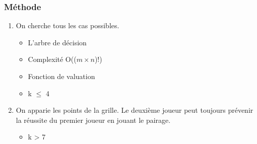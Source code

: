 \documentclass{beamer}
\begin{document}
\begin{frame}[t]
    \frametitle{Méthode}
    \begin{enumerate}
        \item On cherche tous les cas possibles.
            \begin{itemize}
                \item L'arbre de décision
                    \pause
                \item Complexité O(($m \times n$)!)
                    \pause
                \item{Fonction de valuation}
                    \pause
                \item k $\le$ 4
            \end{itemize}
        \item<6->On apparie les points de la grille. Le deuxième joueur peut toujours prévenir la réussite du premier joueur en jouant le pairage.
            \begin{itemize}
                \item<7-> k > 7
            \end{itemize}

    \end{enumerate}
    \cleargoban
\end{frame}
\end{document}
